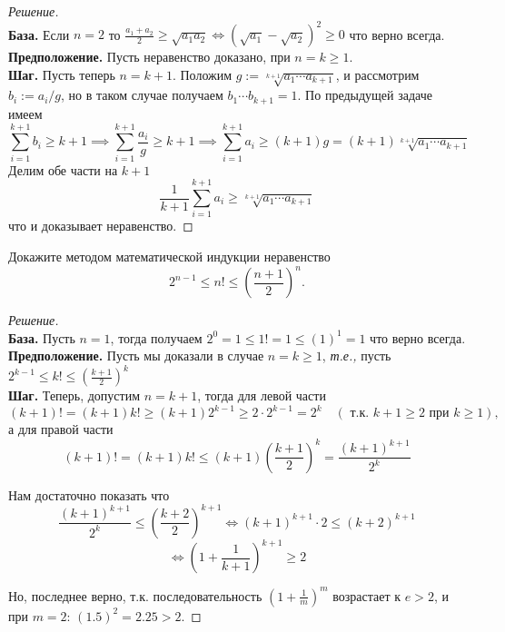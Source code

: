 \begin{proof}[Решение]~\\
\textbf{База.} Если \(n=2\) то \(\frac{a_1+a_2}{2} \geq \sqrt{a_1 a_2} \iff (\sqrt{a_1} - \sqrt{a_2})^2 \geq 0\) что верно всегда. \\
\textbf{Предположение.} Пусть неравенство доказано, при \(n=k\ge 1\). \\
\textbf{Шаг.} Пусть теперь \(n=k+1\). Положим \(g := \sqrt[k+1]{a_1 \cdots a_{k+1}}\), и рассмотрим \(b_i := a_i / g\), но в таком случае получаем \( b_1 \cdots b_{k+1} = 1\). По предыдущей задаче имеем
\[
\sum_{i=1}^{k+1} b_i \geq k+1 \implies \sum_{i=1}^{k+1} \frac{a_i}{g} \geq k+1 \implies \sum_{i=1}^{k+1} a_i \geq (k+1) g = (k+1) \sqrt[k+1]{a_1 \cdots a_{k+1}}
\]
Делим обе части на \(k+1\)
\[
\frac{1}{k+1} \sum_{i=1}^{k+1} a_i \geq \sqrt[k+1]{a_1 \cdots a_{k+1}}
\]    
что и доказывает неравенство.
\end{proof}

\begin{problem}
 Докажите методом математической индукции неравенство 
 $$2^{n-1} \leq n! \leq \left(\frac{n+1}{2}\right)^n.$$
\end{problem}

\begin{proof}[Решение]~ \\
\textbf{База.} Пусть \(n=1\), тогда получаем \(2^0 = 1 \leq 1! = 1 \leq (1)^1 = 1\) что верно всегда. \\
\textbf{Предположение.} Пусть мы доказали в случае \(n=k\ge 1\), \textit{т.е.,} пусть \(2^{k-1} \leq k! \leq \left(\frac{k+1}{2}\right)^k\) \\
\textbf{Шаг.} Теперь, допустим \(n=k+1\), тогда для левой части
\[
(k+1)! = (k+1)k! \geq (k+1) 2^{k-1} \geq 2 \cdot 2^{k-1} = 2^k \quad (\text{ т.к. } k+1 \geq 2 \text{ при } k \geq 1),
\]
а для правой части
\[
(k+1)! = (k+1)k! \leq (k+1) \left(\frac{k+1}{2}\right)^k = \frac{(k+1)^{k+1}}{2^k}
\]

Нам достаточно показать что
\[
\frac{(k+1)^{k+1}}{2^k} \leq \left(\frac{k+2}{2}\right)^{k+1} \iff (k+1)^{k+1} \cdot 2 \leq (k+2)^{k+1}
\]
\[
\iff \left(1 + \frac{1}{k+1}\right)^{k+1} \geq 2
\]

Но, последнее верно, т.к. последовательность \(\left(1 + \frac{1}{m}\right)^m\) возрастает к \(e > 2\), и при \(m=2\): \((1.5)^2 = 2.25 > 2\).
    
\end{proof}

